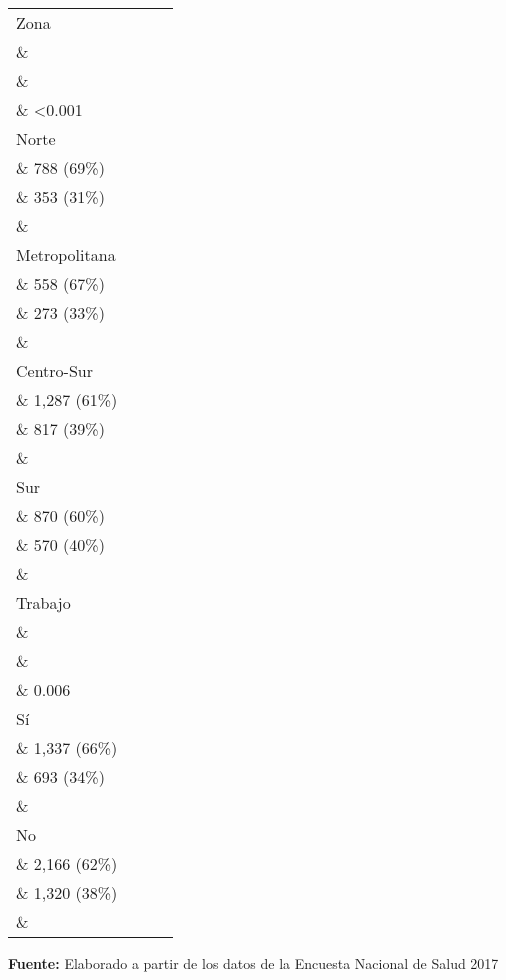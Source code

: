 \documentclass{aa}
\begin{document}
\begin{table}[]
\begin{tabular}{lccc}
Zona \\\&  \\\&  \\\& <0.001 \\ 
\-\hspace{5mm} \tiny Norte \\\& 788 (69\%) \\\& 353 (31\%) \\\&  \\ 
\-\hspace{5mm} \tiny Metropolitana \\\& 558 (67\%) \\\& 273 (33\%) \\\&  \\ 
\-\hspace{5mm} \tiny Centro-Sur \\\& 1,287 (61\%) \\\& 817 (39\%) \\\&  \\ 
\-\hspace{5mm} \tiny Sur \\\& 870 (60\%) \\\& 570 (40\%) \\\&  \\ 
Trabajo \\\&  \\\&  \\\& 0.006 \\ 
\-\hspace{5mm} \tiny Sí \\\& 1,337 (66\%) \\\& 693 (34\%) \\\&  \\ 
\-\hspace{5mm} \tiny No \\\& 2,166 (62\%) \\\& 1,320 (38\%) \\\&  \\ 
 \bottomrule
\end{tabular}
    \vspace{1ex}
    
    {\raggedright \small \textbf{Fuente:} Elaborado a partir de los datos de la Encuesta Nacional de Salud 2017 \par}
\end{table}
\end{document}

